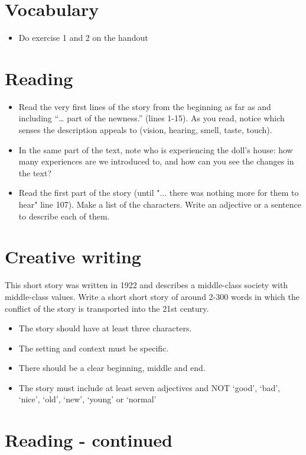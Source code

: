 \documentclass[11pt,a4paper,oneside]{book}
\begin{document}
\section*{Vocabulary}

\begin{itemize}
\item Do exercise 1 and 2 on the handout
\end{itemize}

\section*{Reading}

\begin{itemize}
\item Read the very first lines of the story from the beginning as far as and including “… part of the newness.” (lines 1-15). As you read, notice which senses the description appeals to (vision, hearing, smell, taste, touch).
\item In the same part of the text, note who is experiencing the doll’s house: how many experiences are we introduced to, and how can you see the changes in the text?
\item Read the first part of the story (until "... there was nothing more for them to hear" line 107). Make a list of the characters. Write an adjective or a sentence to describe each of them.
\end{itemize}

\section*{Creative writing}
This short story was written in 1922 and describes a middle-class society with middle-class values. Write a short short story of around 2-300 words in which the conflict of the story is transported into the 21st century.


\begin{itemize}
\item The story should have at least three characters.
\item The setting and context must be specific.
\item There should be a clear beginning, middle and end.
\item The story must include at least seven adjectives and NOT ‘good’, ‘bad’, ‘nice’, ‘old’, ‘new’, ‘young’ or ‘normal’
\end{itemize}

\section*{Reading - continued}
\end{document}
